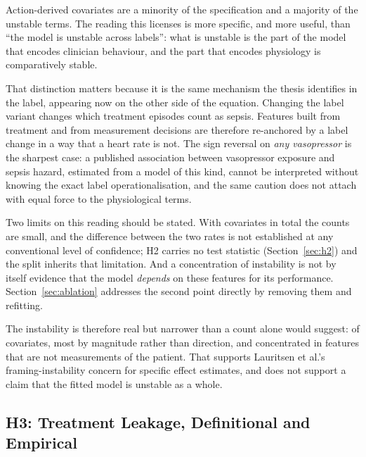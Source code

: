 Action-derived covariates are a minority of the specification and a majority of
the unstable terms. The reading this licenses is more specific, and more useful,
than ``the model is unstable across labels'': what is unstable is the part of
the model that encodes clinician behaviour, and the part that encodes
physiology is comparatively stable.

That distinction matters because it is the same mechanism the thesis identifies
in the label, appearing now on the other side of the equation. Changing the
label variant changes which treatment episodes count as sepsis. Features built
from treatment and from measurement decisions are therefore re-anchored by a
label change in a way that a heart rate is not. The sign reversal on \emph{any
vasopressor} is the sharpest case: a published association between vasopressor
exposure and sepsis hazard, estimated from a model of this kind, cannot be
interpreted without knowing the exact label operationalisation, and the
same caution does not attach with equal force to the physiological terms.

Two limits on this reading should be stated. With \pcHTwoNTerms{} covariates in
total the counts are small, and the difference between the two rates is not
established at any conventional level of confidence; H2 carries no test
statistic (Section~\ref{sec:h2}) and the split inherits that limitation. And a
concentration of instability is not by itself evidence that the model
\emph{depends} on these features for its performance. Section~\ref{sec:ablation}
addresses the second point directly by removing them and refitting.

The instability is therefore real but narrower than a count alone would suggest:
\pcHTwoEst{} of \pcHTwoNTerms{} covariates, most by magnitude rather than
direction, and concentrated in features that are not measurements of the
patient. That supports Lauritsen et al.'s \cite{lauritsen2021framing}
framing-instability concern for specific effect estimates, and does not support
a claim that the fitted model is unstable as a whole.

\subsection{H3: Treatment Leakage, Definitional and Empirical}
\label{sec:h3}

